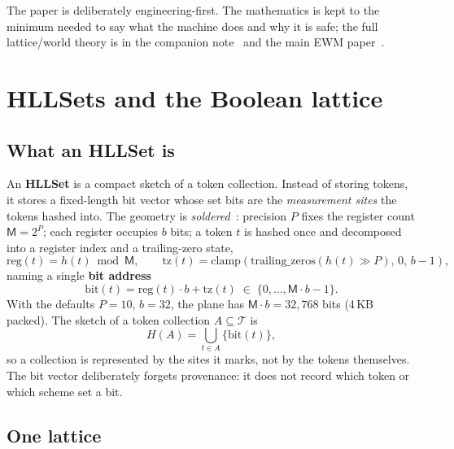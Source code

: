 \documentclass[11pt,a4paper]{article}
\theoremstyle{remark}
\newcommand{\Tok}{\ensuremath{\mathcal{T}}}           %
\newcommand{\HLL}{\ensuremath{H}}                     %
\newcommand{\Reg}{\ensuremath{\mathsf{M}}}            %
\newcommand{\Prec}{\ensuremath{P}}                    %
\newcommand{\Bits}{\ensuremath{b}}                    %
\begin{document}
The paper is deliberately engineering-first. The mathematics is kept to the
minimum needed to say what the machine does and why it is safe; the full
lattice/world theory is in the companion note~\cite{companion2026} and the main
EWM paper~\cite{ewm2026}.

\section{HLLSets and the Boolean lattice}
\label{sec:roots}

\subsection{What an HLLSet is}

An \textbf{HLLSet} is a compact sketch of a token collection. Instead of storing
tokens, it stores a fixed-length bit vector whose set bits are the
\emph{measurement sites} the tokens hashed into. The geometry is
\emph{soldered}~\cite{astesj2026,companion2026}: precision $\Prec$ fixes the
register count $\Reg = 2^{\Prec}$; each register occupies $\Bits$ bits; a token
$t$ is hashed once and decomposed into a register index and a trailing-zero
state,
\begin{equation}
\label{eq:position}
\mathrm{reg}(t) = h(t) \bmod \Reg,
\qquad
\mathrm{tz}(t) = \mathrm{clamp}\!\left(\mathrm{trailing\_zeros}(h(t)\gg\Prec),\,0,\,\Bits-1\right),
\end{equation}
naming a single \textbf{bit address}
\begin{equation}
\label{eq:bit}
\mathrm{bit}(t) = \mathrm{reg}(t)\cdot\Bits + \mathrm{tz}(t)
\;\in\;\{0,\dots,\Reg\cdot\Bits-1\}.
\end{equation}
With the defaults $\Prec=10$, $\Bits=32$, the plane has
$\Reg\cdot\Bits = 32{,}768$ bits (4\,KB packed). The sketch of a token collection
$A\subseteq\Tok$ is
\begin{equation}
\label{eq:sketch}
\HLL(A) = \bigcup_{t\in A}\{\mathrm{bit}(t)\},
\end{equation}
so a collection is represented by the sites it marks, not by the tokens
themselves. The bit vector deliberately forgets provenance: it does not record
which token or which scheme set a bit.

\subsection{One lattice}
\end{document}
